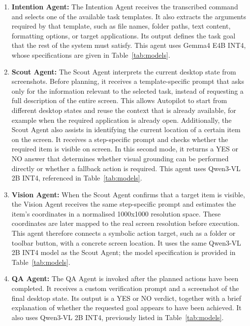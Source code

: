 \begin{enumerate}
  \item \textbf{Intention Agent:} The Intention Agent receives the transcribed command and selects one of the available task templates. It also extracts the arguments required by that template, such as file names, folder paths, text content, formatting options, or target applications. Its output defines the task goal that the rest of the system must satisfy. This agent uses Gemma4 E4B INT4, whose specifications are given in Table~\ref{tab:models}.

  \item \textbf{Scout Agent:} The Scout Agent interprets the current desktop state from screenshots. Before planning, it receives a template-specific prompt that asks only for the information relevant to the selected task, instead of requesting a full description of the entire screen. This allows Autopilot to start from different desktop states and reuse the context that is already available, for example when the required application is already open. Additionally, the Scout Agent also assists in identifying the current location of a certain item on the screen. It receives a step-specific prompt and checks whether the required item is visible on screen. In this second mode, it returns a YES or NO answer that determines whether visual grounding can be performed directly or whether a fallback action is required. This agent uses Qwen3-VL 2B INT4, referenced in Table~\ref{tab:models}.

  \item \textbf{Vision Agent:} When the Scout Agent confirms that a target item is visible, the Vision Agent receives the same step-specific prompt and estimates the item's coordinates in a normalised 1000x1000 resolution space. These coordinates are later mapped to the real screen resolution before execution. This agent therefore connects a symbolic action target, such as a folder or toolbar button, with a concrete screen location. It uses the same Qwen3-VL 2B INT4 model as the Scout Agent; the model specification is provided in Table~\ref{tab:models}.

  \item \textbf{QA Agent:} The QA Agent is invoked after the planned actions have been completed. It receives a custom verification prompt and a screenshot of the final desktop state. Its output is a YES or NO verdict, together with a brief explanation of whether the requested goal appears to have been achieved. It also uses Qwen3-VL 2B INT4, previously listed in Table~\ref{tab:models}.
\end{enumerate}

